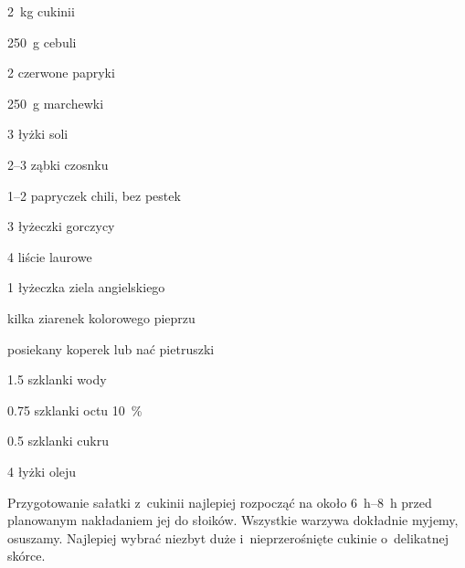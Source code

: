 \documentclass[../kucharek.tex]{subfiles}
\begin{document}

\begin{Ingred}
    \item \qty{2}{\kilo\gram} cukinii
    \item \qty{250}{\gram} cebuli
    \item \num{2} czerwone papryki
    \item \qty{250}{\gram} marchewki
    \item \num{3} łyżki soli
    \item \numrange{2}{3} ząbki czosnku
    \item \numrange{1}{2} papryczek chili, bez pestek
    \item \num{3} łyżeczki gorczycy
    \item \num{4} liście laurowe
    \item \num{1} łyżeczka ziela angielskiego
    \item kilka ziarenek kolorowego pieprzu
    \item posiekany koperek lub nać pietruszki
\end{Ingred}

\begin{Ingred}[zalewa]
    \item \num{1.5} szklanki wody
    \item \num{0.75} szklanki octu \qty{10}{\percent}
    \item \num{0.5} szklanki cukru
    \item \num{4} łyżki oleju
\end{Ingred}

Przygotowanie sałatki z~cukinii najlepiej rozpocząć na około
\qtyrange{6}{8}{\hour} przed planowanym nakładaniem jej do słoików. Wszystkie
warzywa dokładnie myjemy, osuszamy. Najlepiej wybrać niezbyt duże
i~nieprzerośnięte cukinie o~delikatnej skórce.
\end{document}
